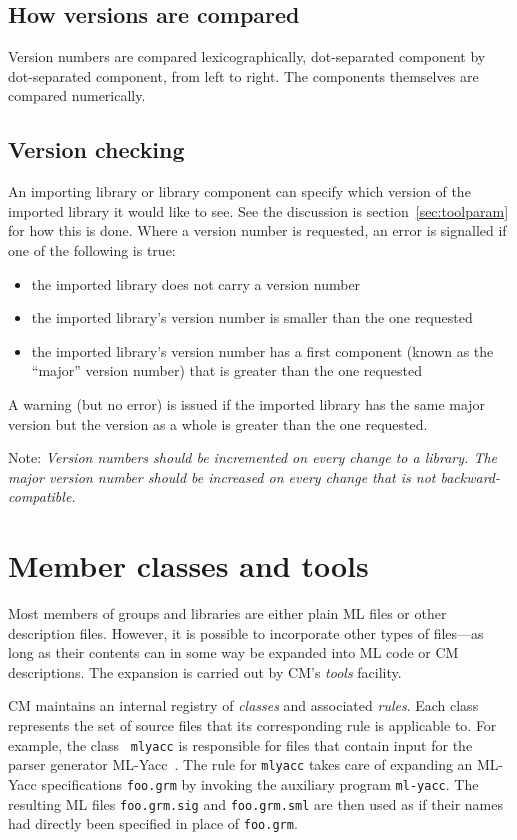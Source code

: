 \documentclass[titlepage,letterpaper]{article}
\begin{document}
\subsection{How versions are compared}

Version numbers are compared lexicographically, dot-separated
component by dot-separated component, from left to right.  The
components themselves are compared numerically.

\subsection{Version checking}

An importing library or library component can specify which version of
the imported library it would like to see.  See the discussion is
section~\ref{sec:toolparam} for how this is done.  Where a version
number is requested, an error is signalled if one of the following is
true:

\begin{itemize}
\item the imported library does not carry a version number
\item the imported library's version number is smaller than the
one requested
\item the imported library's version number has a first component
(known as the ``major'' version number) that is greater than the one
requested
\end{itemize}

A warning (but no error) is issued if the imported library has the
same major version but the version as a whole is greater than the one
requested.

Note: {\it Version numbers should be incremented on every change to a
library.  The major version number should be increased on every change
that is not backward-compatible.}

\section{Member classes and tools}
\label{sec:classes}

Most members of groups and libraries are either plain ML files or
other description files.  However, it is possible to incorporate other
types of files---as long as their contents can in some way be expanded
into ML code or CM descriptions.  The expansion is carried out by CM's
{\it tools} facility.

CM maintains an internal registry of {\em classes} and associated {\em
rules}.  Each class represents the set of source files that its
corresponding rule is applicable to.  For example, the class {\tt
mlyacc} is responsible for files that contain input for the parser
generator ML-Yacc~\cite{tarditi90:yacc}.  The rule for {\tt mlyacc}
takes care of expanding an ML-Yacc specifications {\tt foo.grm} by
invoking the auxiliary program {\tt ml-yacc}.  The resulting ML files
{\tt foo.grm.sig} and {\tt foo.grm.sml} are then used as if their
names had directly been specified in place of {\tt foo.grm}.
\end{document}
